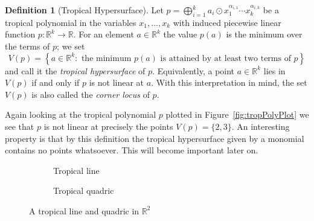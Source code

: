 \documentclass[
  paper=a4,
  titlepage,
  bibliography=totoc,
  pagesize=pdftex
]{scrartcl}
\numberwithin{figure}{section}
\numberwithin{equation}{section}
\numberwithin{table}{section}
\newcommand*\setR{\mathds{R}}
\theoremstyle{definition}
\newtheorem{definition}{Definition}
\numberwithin{definition}{section}
\begin{document}
\begin{definition}[Tropical Hypersurface]
  \label{def:tropHypersurface}
  Let $p = \bigoplus_{i=1}^k a_i \odot x_1^{\alpha_{i,1}}\cdots x_k^{\alpha_{i,k}}$ be a
  tropical polynomial in the variables $x_1, \dots, x_k$ with induced piecewise linear
  function $p:\setR^k \to \setR$. For an element $a\in \setR^k$ the value $p(a)$ is the
  minimum over the terms of $p$; we set
  \[
    V(p) = \left\{
      a \in \setR^k :
      \text{ the minimum $p(a)$ is attained by at least two terms of $p$}
    \right\}
  \]
  and call it the \emph{tropical hypersurface} of $p$. Equivalently, a point $a\in
  \setR^k$ lies in $V(p)$ if and only if $p$ is not linear at $a$. With this
  interpretation in mind, the set $V(p)$ is also called the \emph{corner locus} of $p$.
\end{definition}

Again looking at the tropical polynomial $p$ plotted in Figure~\ref{fig:tropPolyPlot} we
see that $p$ is not linear at precisely the points $V(p) = \{ 2, 3 \}$. An interesting
property is that by this definition the tropical hypersurface given by a monomial contains
no points whatsoever. This will become important later on.

\begin{figure}[tbh]
  \centering
  \begin{subfigure}{0.49\textwidth}
    \centering
    \caption{Tropical line}
    \label{fig:trop:line}
  \end{subfigure}
  \begin{subfigure}{0.49\textwidth}
    \centering
    \caption{Tropical quadric}
    \label{fig:trop:quad}
  \end{subfigure}
  \caption{A tropical line and quadric in $\setR^2$}
  \label{fig:tropLineQuad}
\end{figure}
\end{document}
